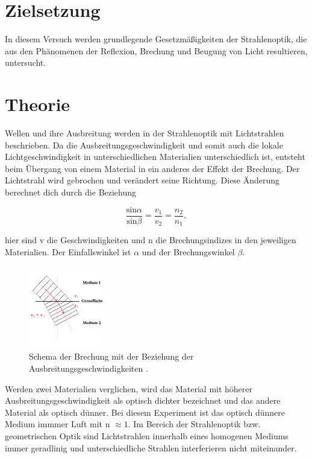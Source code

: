 \section{Zielsetzung}
\noindent In diesem Versuch werden grundlegende Gesetzmäßigkeiten der Strahlenoptik, die aus den Phänomenen der Reflexion, Brechung und Beugung von Licht resultieren, untersucht.
    

\section{Theorie}
\label{sec:Theorie}
Wellen und ihre Ausbreitung werden in der Strahlenoptik mit Lichtstrahlen beschrieben. Da die 
Ausbreitungsgeschwindigkeit und somit auch die lokale Lichtgeschwindigkeit in unterschiedlichen Materialien unterschiedlich ist, entsteht beim 
Übergang von einem Material in ein anderes der Effekt der Brechung. Der Lichtstrahl wird gebrochen und verändert seine Richtung. 
Diese Änderung berechnet dich durch die Beziehung

    \begin{equation}
        \frac{\text{sin}\alpha}{\text{sin} \beta} = \frac{v_1}{v_2} = \frac{n_2}{n_1},
    \end{equation}

    \noindent   hier sind v die Geschwindigkeiten und n die Brechungsindizes in den jeweiligen Materialien. Der Einfallswinkel ist $\alpha$ und der 
    Brechungswinkel $\beta$.

    \begin{figure}[H]
        \centering
        \includegraphics[width=0.3\textwidth]{images/pic1.PNG}
        \caption{Schema der Brechung mit der Beziehung der Ausbreitungsgeschwindigkeiten \cite{400}.}
     \label{fig:brech}
    \end{figure}

    \noindent Werden zwei Materialien verglichen, wird das Material mit höherer Ausbreitungsgeschwindigkeit als optisch dichter bezeichnet und das andere Material als optisch dünner. Bei diesem Experiment ist das optisch dünnere Medium immmer Luft mit n $\approx 1$. Im Bereich der Strahlenoptik bzw. geometrischen Optik sind Lichtstrahlen innerhalb eines homogenen Mediums immer geradlinig und unterschiedliche Strahlen interferieren nicht miteinander.

